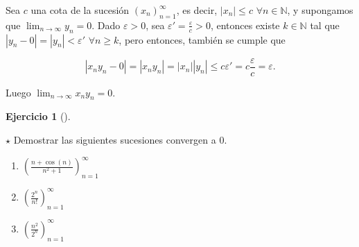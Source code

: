 \documentclass[
  spanish,
  a4paper,
]{scrreport}
\theoremstyle{definition}
\newtheorem{exercise}{Ejercicio}[chapter]
\theoremstyle{remark}
\begin{document}
\begin{tcolorbox}[enhanced jigsaw, arc=.35mm, bottomrule=.15mm, bottomtitle=1mm, breakable, colback=white, colbacktitle=quarto-callout-tip-color!10!white, colframe=quarto-callout-tip-color-frame, coltitle=black, left=2mm, leftrule=.75mm, opacityback=0, opacitybacktitle=0.6, rightrule=.15mm, title=\textcolor{quarto-callout-tip-color}{\faLightbulb}\hspace{0.5em}{Solución}, titlerule=0mm, toprule=.15mm, toptitle=1mm]

Sea \(c\) una cota de la sucesión \((x_n)_{n=1}^\infty\), es decir,
\(|x_n|\leq c\) \(\forall n\in\mathbb{N}\), y supongamos que
\(\lim_{n\to\infty}y_n=0\). Dado \(\varepsilon>0\), sea
\(\varepsilon'=\frac{\varepsilon}{c}>0\), entonces existe
\(k\in\mathbb{N}\) tal que \(|y_n-0|=|y_n|<\varepsilon'\)
\(\forall n\geq k\), pero entonces, también se cumple que

\[
|x_ny_n-0| = |x_ny_n| = |x_n||y_n| \leq c\varepsilon' = c\frac{\varepsilon}{c} = \varepsilon.
\]

Luego \(\lim_{n\to\infty}x_ny_n = 0\).

\end{tcolorbox}

\begin{exercise}[]\protect\hypertarget{exr-compresion-sucesiones}{}\label{exr-compresion-sucesiones}

\(\star\) Demostrar las siguientes sucesiones convergen a \(0\).

\begin{enumerate}
\def\labelenumi{\alph{enumi}.}
\item
  \(\left(\frac{n+\cos(n)}{n^2+1}\right)_{n=1}^\infty\)
\item
  \(\left(\frac{2^n}{n!}\right)_{n=1}^\infty\)
\item
  \(\left(\frac{n^2}{2^n}\right)_{n=1}^\infty\)
\end{enumerate}

\end{exercise}
\end{document}

